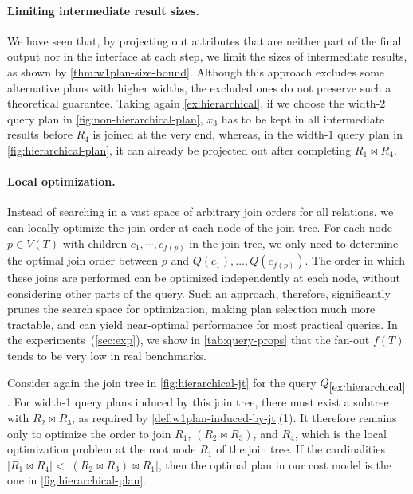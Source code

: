 \paragraph{Limiting intermediate result sizes.}
We have seen that, by projecting out attributes that are neither part of the final output nor in the interface at each step, we limit the sizes of intermediate results, as shown by \cref{thm:w1plan-size-bound}.
Although this approach excludes some alternative plans with higher widths, the excluded ones do not preserve such a theoretical guarantee.
    Taking again \cref{ex:hierarchical}, 
    if we choose the width-2 query plan in \cref{fig:non-hierarchical-plan}, $x_3$ has to be kept in all intermediate results before $R_4$ is joined at the very end, whereas, in the width-1 query plan in \cref{fig:hierarchical-plan}, it can already be projected out after completing $R_1 \bowtie R_4$.

\paragraph{Local optimization.}  Instead of searching in a vast space of arbitrary join orders for all relations, we can locally optimize the join order at each node of the join tree. For each node $p \in V(T)$ with children $c_1, \cdots, c_{f(p)}$ in the join tree, we only need to determine the optimal join order between $p$ and $Q(c_1), \dots, Q(c_{f(p)})$. The order in which these joins are performed can be optimized independently at each node, without considering other parts of the query. Such an approach, therefore, significantly prunes the search space for optimization, making plan selection much more tractable, and can yield near-optimal performance for most practical queries. In the experiments~(\cref{sec:exp}), we show in \cref{tab:query-props} that the fan-out $f(T)$ tends to be very low in real benchmarks.

\begin{example}
    Consider again the join tree in \cref{fig:hierarchical-jt} for the query $Q_{\ref{ex:hierarchical}}$. For width-1 query plans induced by this join tree, there must exist a subtree with $R_2 \bowtie R_3$, as required by \cref{def:w1plan-induced-by-jt}(1). It therefore remains only to optimize the order to join $R_1$, $(R_2 \bowtie R_3)$, and $R_4$, which is the local optimization problem at the root node $R_1$ of the join tree. If the cardinalities $|R_1 \bowtie R_4| < |(R_2 \bowtie R_3) \bowtie R_1|$, then the optimal plan in our cost model is the one in \cref{fig:hierarchical-plan}.
\end{example}

